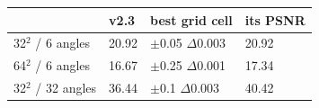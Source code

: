 \begin{tabular}{llll}
\toprule
 & v2.3 & best grid cell & its PSNR \\
\midrule
32$^2$ / 6 angles & 20.92 & $\pm$0.05 $\Delta$0.003 & 20.92 \\
64$^2$ / 6 angles & 16.67 & $\pm$0.25 $\Delta$0.001 & 17.34 \\
32$^2$ / 32 angles & 36.44 & $\pm$0.1 $\Delta$0.003 & 40.42 \\
\bottomrule
\end{tabular}
